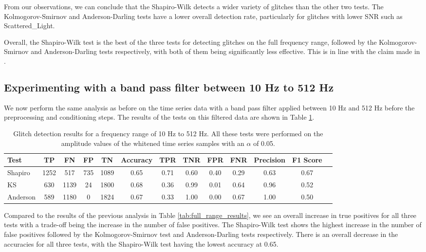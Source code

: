 \documentclass[12pt]{article}
\begin{document}
\noindent From our observations, we can conclude that the Shapiro-Wilk detects a wider variety of glitches than the other two tests. The Kolmogorov-Smirnov and Anderson-Darling tests have a lower overall detection rate, particularly for glitches with lower SNR such as Scattered\_Light.

\medskip
\noindent Overall, the Shapiro-Wilk test is the best of the three tests for detecting glitches on the full frequency range, followed by the Kolmogorov-Smirnov and Anderson-Darling tests respectively, with both of them being significantly less effective. This is in line with the claim made in \cite{razali2011power}.

\pagebreak

\subsection{Experimenting with a band pass filter between 10 Hz to 512 Hz}\label{Experiment_2}

We now perform the same analysis as before on the time series data with a band pass filter applied between 10 Hz and 512 Hz before the preprocessing and conditioning steps. The results of the tests on this filtered data are shown in Table \ref{tab:low_frequency_results}.

\begin{table}[H]
  \centering
  \begin{tabular}{lcccccccccccc}
  \toprule
  Test & TP & FN & FP & TN & Accuracy & TPR & TNR & FPR & FNR & Precision & F1 Score \\
  \midrule
  Shapiro & 1252 & 517 & 735 & 1089 & 0.65 & 0.71 & 0.60 & 0.40 & 0.29 & 0.63 & 0.67 \\
  KS & 630 & 1139 & 24 & 1800 & 0.68 & 0.36 & 0.99 & 0.01 & 0.64 & 0.96 & 0.52 \\
  Anderson & 589 & 1180 & 0 & 1824 & 0.67 & 0.33 & 1.00 & 0.00 & 0.67 & 1.00 & 0.50 \\
  \bottomrule
  \end{tabular}
  \caption{Glitch detection results for a frequency range of 10 Hz to 512 Hz. All these tests were performed on the amplitude values of the whitened time series samples with an $\alpha$ of 0.05.}
  \label{tab:low_frequency_results}
\end{table}

\noindent Compared to the results of the previous analysis in Table \ref{tab:full_range_results}, we see an overall increase in true positives for all three tests with a trade-off being the increase in the number of false positives. The Shapiro-Wilk test shows the highest increase in the number of false positives followed by the Kolmogorov-Smirnov test and Anderson-Darling tests respectively. There is an overall decrease in the accuracies for all three tests, with the Shapiro-Wilk test having the lowest accuracy at 0.65.
\end{document}
